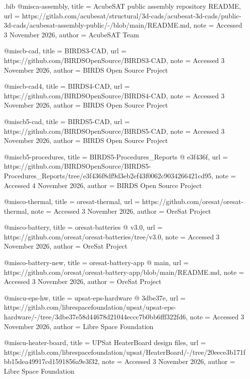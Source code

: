 \begin{filecontents*}[overwrite]{\jobname.bib}
@misc{a-assembly,
  title = {{AcubeSAT public assembly repository README}},
  url = {https://gitlab.com/acubesat/structural/3d-cads/acubesat-3d-cads/public-3d-cads/acubesat-assembly-public/-/blob/main/README.md},
  note = {Accessed 3 November 2026},
  author = {{AcubeSAT Team}}
}

@misc{b-cad,
  title = {{BIRDS3-\allowbreak{}CAD}},
  url = {https://github.com/BIRDSOpenSource/BIRDS3-CAD},
  note = {Accessed 3 November 2026},
  author = {{BIRDS Open Source Project}}
}

@misc{b-cad4,
  title = {{BIRDS4-\allowbreak{}CAD}},
  url = {https://github.com/BIRDSOpenSource/BIRDS4-CAD},
  note = {Accessed 3 November 2026},
  author = {{BIRDS Open Source Project}}
}

@misc{b5-cad,
  title = {{BIRDS5-\allowbreak{}CAD}},
  url = {https://github.com/BIRDSOpenSource/BIRDS5-CAD},
  note = {Accessed 3 November 2026},
  author = {{BIRDS Open Source Project}}
}

@misc{b5-procedures,
  title = {{BIRDS5-\allowbreak{}Procedures\_\allowbreak{}Reports @ e3f436f}},
  url = {https://github.com/BIRDSOpenSource/BIRDS5-Procedures_Reports/tree/e3f436f8df9d3eb2ef43f0062c9034266421cd95},
  note = {Accessed 4 November 2026},
  author = {{BIRDS Open Source Project}}
}

@misc{o-thermal,
  title = {{oresat-\allowbreak{}thermal}},
  url = {https://github.com/oresat/oresat-thermal},
  note = {Accessed 3 November 2026},
  author = {{OreSat Project}}
}

@misc{o-battery,
  title = {{oresat-\allowbreak{}batteries @ v3.0}},
  url = {https://github.com/oresat/oresat-batteries/tree/v3.0},
  note = {Accessed 3 November 2026},
  author = {{OreSat Project}}
}

@misc{o-battery-new,
  title = {{oresat-\allowbreak{}battery-\allowbreak{}app @ main}},
  url = {https://github.com/oresat/oresat-battery-app/blob/main/README.md},
  note = {Accessed 3 November 2026},
  author = {{OreSat Project}}
}

@misc{u-eps-hw,
  title = {{upsat-\allowbreak{}eps-\allowbreak{}hardware @ 3dbe37e}},
  url = {https://gitlab.com/librespacefoundation/upsat/upsat-eps-hardware/-/tree/3dbe37e58d44678d21044eccc7b0bb6fff322fd6},
  note = {Accessed 3 November 2026},
  author = {{Libre Space Foundation}}
}

@misc{u-heater-board,
  title = {{UPSat HeaterBoard design files}},
  url = {https://gitlab.com/librespacefoundation/upsat/HeaterBoard/-/tree/20eece3b171fbb15dea49917cd1591856a9e3f32},
  note = {Accessed 3 November 2026},
  author = {{Libre Space Foundation}}
}


\end{filecontents*}
